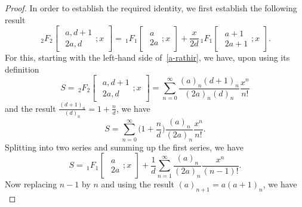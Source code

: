 \documentclass[reqno]{amsart}
\numberwithin{equation}{section}
\theoremstyle{plain}
\theoremstyle{remark}
\begin{document}
\begin{proof}
In order to establish the required identity, we first establish the following result
\begin{equation}\label{a-rathir}
{\,}_2F_2\begin{bmatrix}
\begin{gathered}
a,d+1\\2a,d
\end{gathered};x
\end{bmatrix}
={\,}_1F_1\begin{bmatrix}
\begin{gathered}
a\\2a
\end{gathered};x
\end{bmatrix}
+\frac{x}{2d}{\,}_1F_1\begin{bmatrix}
\begin{gathered}
a+1\\2a+1
\end{gathered};x
\end{bmatrix}.
\end{equation}
For this, starting with the left-hand side of~\eqref{a-rathir}, we have, upon using its definition
\begin{equation*}
S={\,}_2F_2\begin{bmatrix}
\begin{gathered}
a,d+1\\2a,d
\end{gathered};x
\end{bmatrix}
=\sum_{n=0}^{\infty}\frac{(a)_n(d+1)_n}{(2a)_n(d)_n}\frac{x^n}{n!}
\end{equation*}
and the result $\tfrac{(d+1)_n}{(d)_n}=1+\tfrac{n}{d}$, we have
\begin{equation*}
S=\sum_{n=0}^{\infty}\biggl(1+\frac{n}{d}\biggr)\frac{(a)_n}{(2a)_n}\frac{x^n}{n!}.
\end{equation*}
Splitting into two series and summing up the first series, we have
\begin{equation*}
S={\,}_1F_1\begin{bmatrix}
\begin{gathered}
a\\2a
\end{gathered};x
\end{bmatrix}
+\frac{1}{d}\sum_{n=1}^{\infty}\frac{(a)_n}{(2a)_n}\frac{x^n}{(n-1)!}.
\end{equation*}
Now replacing $n-1$ by $n$ and using the result $(a)_{n+1}=a(a+1)_n$, we have
\begin{equation*}

\end{equation*}
\end{proof}
\end{document}

